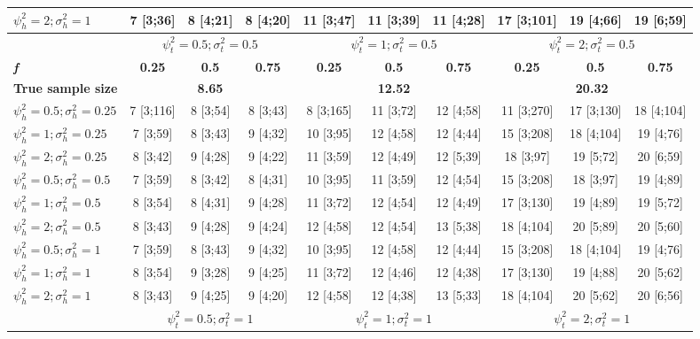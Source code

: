 \begin{table}[ht]
{\begin{tabular}{l c c c c c c c c c}
$\psi_h^2 = 2; \sigma_h^2 = 1$ & 7 [3;36] & 8 [4;21] & 8 [4;20] & 11 [3;47] & 11 [3;39] & 11 [4;28] & 17 [3;101] & 19 [4;66] & 19 [6;59] \\
\hline 
 & \multicolumn{3}{c}{$\psi_t^2 = 0.5; \sigma_t^2 = 0.5$} & \multicolumn{3}{c}{$\psi_t^2 = 1; \sigma_t^2 = 0.5$} & \multicolumn{3}{c}{$\psi_t^2= 2; \sigma_t^2 = 0.5$} \\
\addlinespace[1pt]
\cmidrule(lr){2-4} \cmidrule(lr){5-7} \cmidrule(lr){8-10}
\textbf{\textit{f}} & \textbf{0.25} & \textbf{0.5} & \textbf{0.75} & \textbf{0.25} & \textbf{0.5} & \textbf{0.75} & \textbf{0.25} & \textbf{0.5} & \textbf{0.75} \\
\hline
\textbf{True sample size} & \multicolumn{3}{c}{\textbf{8.65}} & \multicolumn{3}{c}{\textbf{12.52}} & \multicolumn{3}{c}{\textbf{20.32}} \\
$\psi_h^2 = 0.5; \sigma_h^2 = 0.25$ & 7 [3;116] & 8 [3;54] & 8 [3;43] & 8 [3;165] & 11 [3;72] & 12 [4;58] & 11 [3;270] & 17 [3;130] & 18 [4;104] \\
$\psi_h^2 = 1; \sigma_h^2 = 0.25$ & 7 [3;59] & 8 [3;43] & 9 [4;32] & 10 [3;95] & 12 [4;58] & 12 [4;44] & 15 [3;208] & 18 [4;104] & 19 [4;76] \\
$\psi_h^2 = 2; \sigma_h^2 = 0.25$ & 8 [3;42] & 9 [4;28] & 9 [4;22] & 11 [3;59] & 12 [4;49] & 12 [5;39] & 18 [3;97] & 19 [5;72] & 20 [6;59] \\
$\psi_h^2 = 0.5; \sigma_h^2 = 0.5$ & 7 [3;59] & 8 [3;42] & 8 [4;31] & 10 [3;95] & 11 [3;59] & 12 [4;54] & 15 [3;208] & 18 [3;97] & 19 [4;89] \\
$\psi_h^2 = 1; \sigma_h^2 = 0.5$ & 8 [3;54] & 8 [4;31] & 9 [4;28] & 11 [3;72] & 12 [4;54] & 12 [4;49] & 17 [3;130] & 19 [4;89] & 19 [5;72] \\
$\psi_h^2 = 2; \sigma_h^2 = 0.5$ & 8 [3;43] & 9 [4;28] & 9 [4;24] & 12 [4;58] & 12 [4;54] & 13 [5;38] & 18 [4;104] & 20 [5;89] & 20 [5;60] \\
$\psi_h^2 = 0.5; \sigma_h^2 = 1$ & 7 [3;59] & 8 [3;43] & 9 [4;32] & 10 [3;95] & 12 [4;58] & 12 [4;44] & 15 [3;208] & 18 [4;104] & 19 [4;76] \\
$\psi_h^2 = 1; \sigma_h^2 = 1$ & 8 [3;54] & 9 [3;28] & 9 [4;25] & 11 [3;72] & 12 [4;46] & 12 [4;38] & 17 [3;130] & 19 [4;88] & 20 [5;62] \\
$\psi_h^2 = 2; \sigma_h^2 = 1$ & 8 [3;43] & 9 [4;25] & 9 [4;20] & 12 [4;58] & 12 [4;38] & 13 [5;33] & 18 [4;104] & 20 [5;62] & 20 [6;56] \\
\hline 
 & \multicolumn{3}{c}{$\psi_t^2 = 0.5; \sigma_t^2 = 1$} & \multicolumn{3}{c}{$\psi_t^2 = 1; \sigma_t^2 = 1$} & \multicolumn{3}{c}{$\psi_t^2 = 2; \sigma_t^2 = 1$} \\

\end{tabular}}
\end{table}
